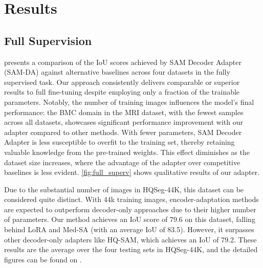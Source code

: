 \section{Results}
\label{sec:samda_results}


\subsection{Full Supervision}
 presents a comparison of the IoU scores achieved by SAM Decoder Adapter (SAM-DA) against alternative baselines across four datasets in the fully supervised task. Our approach consistently delivers comparable or superior results to full fine-tuning despite employing only a fraction of the trainable parameters. Notably, the number of training images influences the model's final performance: the BMC domain in the MRI dataset, with the fewest samples across all datasets, showcases significant performance improvement with our adapter compared to other methods. With fewer parameters, SAM Decoder Adapter is less susceptible to overfit to the training set, thereby retaining valuable knowledge from the pre-trained weights. This effect diminishes as the dataset size increases, where the advantage of the adapter over competitive baselines is less evident. \cref{fig:full_superv} shows qualitative results of our adapter.







Due to the substantial number of images in HQSeg-44K, this dataset can be considered quite distinct. With 44k training images, encoder-adaptation methods are expected to outperform decoder-only approaches due to their higher number of parameters. Our method achieves an IoU score of 79.6 on this dataset, falling behind LoRA and Med-SA (with an average IoU of 83.5). However, it surpasses other decoder-only adapters like HQ-SAM, which achieves an IoU of 79.2. These results are the average over the four testing sets in HQSeg-44K, and the detailed figures can be found on .

